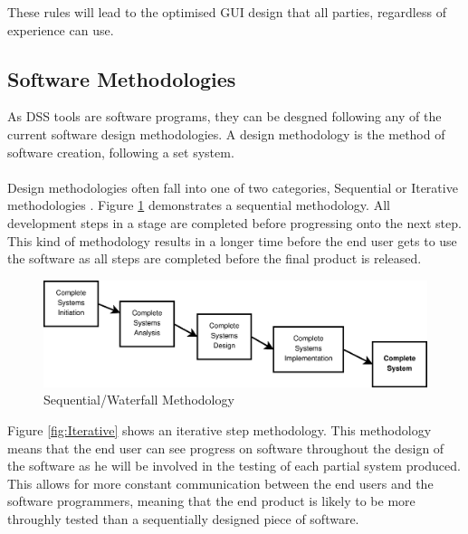 \documentclass[table,a4paper,oneside]{book}
\begin{document}
These rules will lead to the optimised \ac{GUI} design that all parties, regardless of experience can use.

\subsection{Software Methodologies}
\label{sec:Software_Methodologies}

As \ac{DSS} tools are software programs, they can be desgned following any of the current software design methodologies. A design methodology is the method of software creation, following a set system.
\\
\\
Design methodologies often fall into one of two categories, Sequential or Iterative methodologies \citep{Whitten2003}. Figure \ref{fig:Sequential} demonstrates a sequential methodology. All development steps in a stage are completed before progressing onto the next step. This kind of methodology results in a longer time before the end user gets to use the software as all steps are completed before the final product is released.

\begin{figure}[htp]
\begin{center}
	\includegraphics[width=15cm]{./Images/Sequential}
	\caption{Sequential/Waterfall Methodology}
	\label{fig:Sequential}
\end{center}
\end{figure}

Figure \ref{fig:Iterative} shows an iterative step methodology. This methodology means that the end user can see progress on software throughout the design of the software as he will be involved in the testing of each partial system produced. This allows for more constant communication between the end users and the software programmers, meaning that the end product is likely to be more throughly tested than a sequentially designed piece of software.
\end{document}
